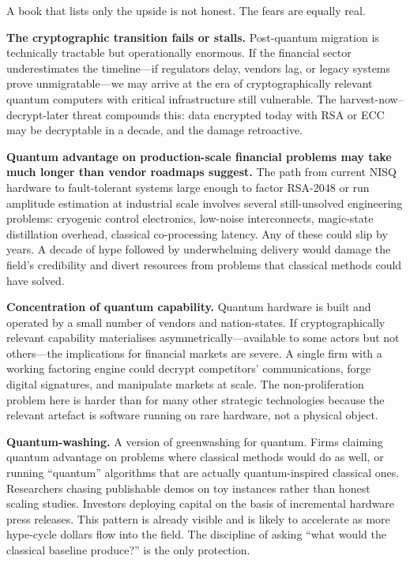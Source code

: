 A book that lists only the upside is not honest. The fears are equally real.

\textbf{The cryptographic transition fails or stalls.} Post-quantum migration is technically tractable but operationally enormous. If the financial sector underestimates the timeline---if regulators delay, vendors lag, or legacy systems prove unmigratable---we may arrive at the era of cryptographically relevant quantum computers with critical infrastructure still vulnerable. The harvest-now--decrypt-later threat compounds this: data encrypted today with RSA or ECC may be decryptable in a decade, and the damage retroactive.

\textbf{Quantum advantage on production-scale financial problems may take much longer than vendor roadmaps suggest.} The path from current NISQ hardware to fault-tolerant systems large enough to factor RSA-2048 or run amplitude estimation at industrial scale involves several still-unsolved engineering problems: cryogenic control electronics, low-noise interconnects, magic-state distillation overhead, classical co-processing latency. Any of these could slip by years. A decade of hype followed by underwhelming delivery would damage the field's credibility and divert resources from problems that classical methods could have solved.

\textbf{Concentration of quantum capability.} Quantum hardware is built and operated by a small number of vendors and nation-states. If cryptographically relevant capability materialises asymmetrically---available to some actors but not others---the implications for financial markets are severe. A single firm with a working factoring engine could decrypt competitors' communications, forge digital signatures, and manipulate markets at scale. The non-proliferation problem here is harder than for many other strategic technologies because the relevant artefact is software running on rare hardware, not a physical object.

\textbf{Quantum-washing.} A version of greenwashing for quantum. Firms claiming quantum advantage on problems where classical methods would do as well, or running ``quantum'' algorithms that are actually quantum-inspired classical ones. Researchers chasing publishable demos on toy instances rather than honest scaling studies. Investors deploying capital on the basis of incremental hardware press releases. This pattern is already visible and is likely to accelerate as more hype-cycle dollars flow into the field. The discipline of asking ``what would the classical baseline produce?'' is the only protection.

